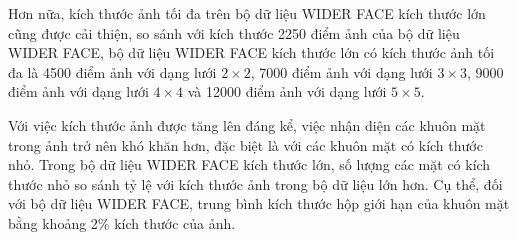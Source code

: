 {    \noindent
    Hơn nữa, kích thước ảnh tối đa trên bộ dữ liệu WIDER FACE kích thước lớn cũng được cải thiện, so sánh với kích thước 2250 điểm ảnh của bộ dữ liệu WIDER FACE, bộ dữ liệu WIDER FACE kích thước lớn có kích thước ảnh tối đa là 4500 điểm ảnh với dạng lưới $2 \times 2$, 7000 điểm ảnh với dạng lưới $3 \times 3$, 9000 điểm ảnh với dạng lưới $4 \times 4$ và 12000 điểm ảnh với dạng lưới $5 \times 5$.

    \noindent
    Với việc kích thước ảnh được tăng lên đáng kể, việc nhận diện các khuôn mặt trong ảnh trở nên khó khăn hơn, đặc biệt là với các khuôn mặt có kích thước nhỏ.
    Trong bộ dữ liệu WIDER FACE kích thước lớn, số lượng các mặt có kích thước nhỏ so sánh tỷ lệ với kích thước ảnh trong bộ dữ liệu lớn hơn.
    Cụ thể, đối với bộ dữ liệu WIDER FACE, trung bình kích thước hộp giới hạn của khuôn mặt bằng khoảng 2\% kích thước của ảnh.

}
